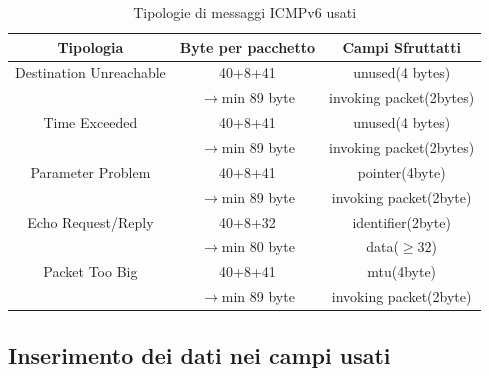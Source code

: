 \begin{longtable}{|c|c|c|} 
\caption{Tipologie di messaggi ICMPv6 usati} 
\label{table:icmpv6:tipologie} \\
    \hline 
    \textbf{Tipologia} & \textbf{Byte per pacchetto} & \textbf{Campi Sfruttatti}  \\
    \hline
    Destination Unreachable & 40+8+41 & unused(4 bytes)\\ 
    &$\rightarrow$min 89 byte&invoking packet(2bytes) \\ %
    \hline 
    Time Exceeded & 40+8+41 & unused(4 bytes)\\ 
    &$\rightarrow$min 89 byte&invoking packet(2bytes) \\ %
    \hline
    Parameter Problem & 40+8+41 & pointer(4byte)\\ 
    &$\rightarrow$min 89 byte&invoking packet(2byte) \\  %
    \hline 
    Echo Request/Reply & 40+8+32 & identifier(2byte)\\ 
    &$\rightarrow$min 80 byte&data($\geq32$) \\ %
    \hline 
    Packet Too Big & 40+8+41 & mtu(4byte)\\ 
    &$\rightarrow$min 89 byte&invoking packet(2byte) \\  %
    \hline 
\end{longtable} 


\subsection{Inserimento dei dati nei campi usati} 
